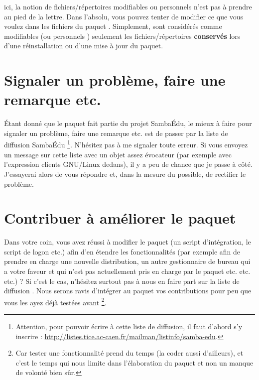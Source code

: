 \begin{RQ}
ici, la notion de fichiers/répertoires \og modifiables \fg{} ou
\og personnels \fg{} n'est pas à prendre
au pied de la lettre. Dans l'absolu, vous pouvez tenter de modifier ce que vous
voulez dans les fichiers du paquet .
Simplement, sont considérés comme
\og modifiables \fg{} (ou \og personnels \fg{})
seulement les fichiers/répertoires \textbf{conservés}
lors d'une réinstallation ou d'une mise à jour du paquet.
\end{RQ}


\section{Signaler un problème, faire une remarque etc.}

Étant donné que le paquet  fait partie du
projet SambaÉdu, le mieux à faire pour signaler un problème, faire
une remarque etc. est de passer par la liste de diffusion SambaÉdu
%
%
\footnote{Attention, pour pouvoir écrire à cette liste de diffusion,
il faut d'abord s'y inscrire :
\url{http://listes.tice.ac-caen.fr/mailman/listinfo/samba-edu}.}.
%
N'hésitez pas à me signaler toute erreur.
Si vous envoyez un message sur cette liste avec un objet assez évocateur (par exemple
avec l'expression \og clients GNU/Linux \fg{} dedans), il y a peu de chance
que je passe à côté. J'essayerai alors de vous répondre et, dans la mesure
du possible, de rectifier le problème.



\section{Contribuer à améliorer le paquet}

Dans votre coin, vous avez réussi à modifier le paquet (un script d'intégration,
le script de logon etc.) afin d'en étendre les fonctionnalités
(par exemple afin de prendre en charge une nouvelle distribution, un
autre gestionnaire de bureau qui a votre faveur et qui n'est pas actuellement
pris en charge par le paquet etc. etc. etc.) ? Si c'est le cas, n'hésitez surtout
pas à nous en faire part sur la liste de diffusion
. Nous serons ravis d'intégrer au paquet
vos contributions pour peu que vous les ayez déjà testées avant%
%
\footnote{Car tester une fonctionnalité prend du temps (la coder aussi d'ailleurs),
et c'est le temps qui nous limite dans l'élaboration du paquet et
non un manque de volonté bien sûr.}.





